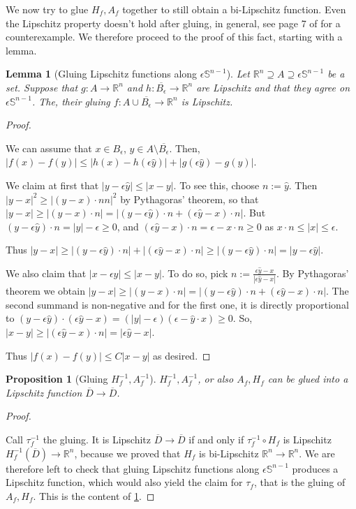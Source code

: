 \documentclass[english,a4paper,10pt,oneside]{scrbook}	%
\theoremstyle{break}
\newtheorem{lemma}[equation]{Lemma}
\newtheorem{prop}[equation]{Proposition}
\newenvironment{mproof}[1][\proofname]{%
  \begin{proof}[#1]$ $\par\nobreak\ignorespaces
}{%
  \end{proof}
}
\renewcommand*{\proofname}{Proof}
\theoremstyle{remark}
\newcommand{\mR}{\mathbb{R}}
\newcommand{\mS}{\mathbb{S}^{n-1}}
\newcommand{\yh}{\hat{y}}
\newcommand{\eps}{\epsilon}
\begin{document}
We now try to glue $H_f, A_f$ together to still obtain a bi-Lipschitz function. Even the Lipschitz property doesn't hold after gluing, in general, see page 7 of \cite{weaver} for a counterexample. We therefore proceed to the proof of this fact, starting with a lemma.

\begin{lemma}[Gluing Lipschitz functions along $\eps \mS$]
\label{lemma:gluing_lip}
Let $\mR^n \supseteq A\supseteq\eps \mS$ be a set. Suppose that $g:A\rightarrow\mR^n$ and $h:\overline{B_\eps}\rightarrow\mR^n$ are Lipschitz and that they agree on $\eps \mS$. The, their gluing $f: A \cup \overline{B_\eps}\rightarrow\mR^n$ is Lipschitz.
\end{lemma}

\begin{mproof}
We can assume that $x \in B_\eps$, $y \in A \setminus \overline{B_\eps}$.
Then, $|f(x)-f(y)|\leq |h(x)-h(\eps \yh)|+|g(\eps \yh)-g(y)|$.

We claim at first that $|y-\eps \yh|\leq  |x-y|$. To see this, choose $n:=\yh$. Then $|y-x|^2 \geq |(y-x)\cdot n n|^2$ by Pythagoras' theorem, so that $|y-x|\geq |(y-x)\cdot n| = |(y-\eps \yh)\cdot n + (\eps \yh -x)\cdot n|$. But $(y-\eps \yh)\cdot n=|y|-\eps \geq 0$, and $(\eps \yh -x)\cdot n = \eps - x\cdot n\geq 0 $ as $x\cdot n \leq |x|\leq \eps$.

Thus  $|y-x|\geq |(y-\eps \yh)\cdot n| + |(\eps \yh -x)\cdot n|\geq  |(y-\eps \yh)\cdot n|=|y-\eps \yh|$.

We also claim that $|x-\eps \yh|\leq |x-y|$. To do so, pick $n:=\frac{\eps\yh -x}{|\eps\yh-x|}$. By Pythagoras' theorem we obtain $|y-x|\geq |(y-x)\cdot n|=|(y-\eps \yh)\cdot n +(\eps \yh -x)\cdot n|$. The second summand is non-negative and for the first one, it is directly proportional to $(y-\eps \yh)\cdot(\eps \yh-x)=(|y|-\eps)(\eps-\yh\cdot x)\geq 0$. So, $|x-y|\geq |(\eps \yh -x)\cdot n|=|\eps \yh -x|$.

Thus $ |f(x)-f(y)|\leq C|x-y|$ as desired.
\end{mproof}

\begin{prop}[Gluing $H_f^{-1}, A_f^{-1}$]
\label{prop:gluing}
$H_f^{-1}, A_f^{-1}$, or also $A_f, H_f$ can be glued into a Lipschitz function $\overline{D}\rightarrow\overline{D}$.
\end{prop}
\begin{mproof}

Call $\tau_f^{-1}$ the gluing. It is Lipschitz $\overline{D}\rightarrow\overline{D}$ if and only if $\tau_f^{-1}\circ H_f$ is Lipschitz $H_f^{-1}(\overline{D})\rightarrow\mR^n$, because we proved that $H_f$ is bi-Lipschitz $\mR^n \rightarrow \mR^n$.
We are therefore left to check that gluing Lipschitz functions along $\eps \mS$ produces a Lipschitz function, which would also yield the claim for $\tau_f$, that is the gluing of $A_f, H_f$. This is the content of \cref{lemma:gluing_lip}.
\end{mproof}
\end{document}
